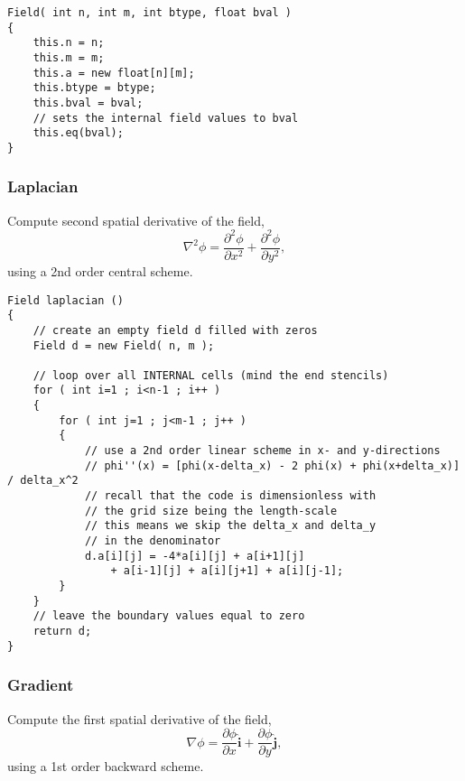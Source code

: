 \documentclass[notitlepage]{article}
\begin{document}
\begin{lstlisting}[style=myCpp]
Field( int n, int m, int btype, float bval )
{
	this.n = n;
	this.m = m;
	this.a = new float[n][m];
	this.btype = btype;
	this.bval = bval;
	// sets the internal field values to bval
	this.eq(bval);
}
\end{lstlisting}

\subsubsection{Laplacian}

Compute second spatial derivative of the field,
%
\begin{equation}
\nabla^2 \phi = \frac{\partial^2\phi}{\partial x^2}
	+ \frac{\partial^2\phi}{\partial y^2},
\end{equation}
%
using a 2nd order central scheme.

\begin{lstlisting}[style=myCpp]
Field laplacian ()
{
	// create an empty field d filled with zeros
	Field d = new Field( n, m );
	
	// loop over all INTERNAL cells (mind the end stencils)
	for ( int i=1 ; i<n-1 ; i++ )
	{
		for ( int j=1 ; j<m-1 ; j++ )
		{
			// use a 2nd order linear scheme in x- and y-directions
			// phi''(x) = [phi(x-delta_x) - 2 phi(x) + phi(x+delta_x)] / delta_x^2
			// recall that the code is dimensionless with
			// the grid size being the length-scale
			// this means we skip the delta_x and delta_y
			// in the denominator
			d.a[i][j] = -4*a[i][j] + a[i+1][j]
				+ a[i-1][j] + a[i][j+1] + a[i][j-1];
		}
	}
	// leave the boundary values equal to zero
	return d;
}
\end{lstlisting}

\subsubsection{Gradient}

Compute the first spatial derivative of the field,
%
\begin{equation}
\nabla \phi = \frac{\partial\phi}{\partial x} \hat{\mathbf{i}}
	+ \frac{\partial\phi}{\partial y} \hat{\mathbf{j}},
\end{equation}
%
using a 1st order backward scheme.
\end{document}
